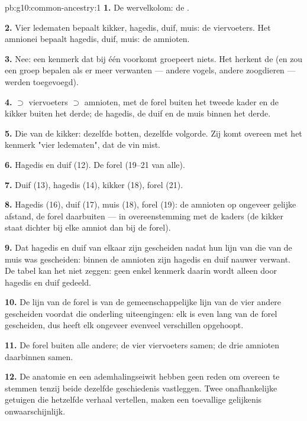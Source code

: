 \begin{solution}{pb:g10:common-ancestry:1}
\textbf{1.} De wervelkolom: de .

\textbf{2.} Vier ledematen bepaalt kikker, hagedis, duif, muis: de
viervoeters. Het amnionei bepaalt hagedis, duif, muis: de amnioten.

\textbf{3.} Nee: een kenmerk dat bij één  voorkomt groepeert niets.
Het herkent de  (en zou een groep bepalen als er meer verwanten ---
andere vogels, andere zoogdieren --- werden toegevoegd).

\textbf{4.}  $\supset$ viervoeters $\supset$ amnioten, met de
forel buiten het tweede kader en de kikker buiten het derde; de hagedis,
de duif en de muis binnen het derde.

\textbf{5.} Die van de kikker: dezelfde botten, dezelfde volgorde. Zij
komt overeen met het kenmerk "vier ledematen", dat de vin mist.

\textbf{6.} Hagedis en duif (12). De forel (19--21 van alle).

\textbf{7.} Duif (13), hagedis (14), kikker (18), forel (21).

\textbf{8.} Hagedis (16), duif (17), muis (18), forel (19): de amnioten
op ongeveer gelijke afstand, de forel daarbuiten --- in overeenstemming
met de kaders (de kikker staat dichter bij elke amniot dan bij de forel).

\textbf{9.} Dat hagedis en duif van elkaar zijn gescheiden nadat hun lijn
van die van de muis was gescheiden: binnen de amnioten zijn hagedis en
duif nauwer verwant. De tabel kan het niet zeggen: geen enkel kenmerk
daarin wordt alleen door hagedis en duif gedeeld.

\textbf{10.} De lijn van de forel is van de gemeenschappelijke lijn van de
vier andere gescheiden voordat die onderling uiteengingen: elk is even
lang van de forel gescheiden, dus heeft elk ongeveer evenveel verschillen
opgehoopt.

\textbf{11.} De forel buiten alle andere; de vier viervoeters samen; de
drie amnioten daarbinnen samen.

\textbf{12.} De anatomie en een ademhalingseiwit hebben geen reden om
overeen te stemmen tenzij beide dezelfde geschiedenis vastleggen. Twee
onafhankelijke getuigen die hetzelfde verhaal vertellen, maken een
toevallige gelijkenis onwaarschijnlijk.


\end{solution}
